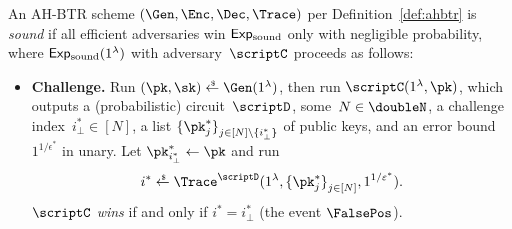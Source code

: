 \begin{definition}[soundness]\label{def:soundness}
An AH-BTR scheme $(\Gen,\Enc,\Dec,\Trace)$ per Definition~\ref{def:ahbtr} is \emph{sound}
if all efficient adversaries win $\ExpSound$ only with negligible probability,
where $\ExpSound(1^\lambda)$ with adversary~$\scriptC$ proceeds as follows:
\begin{itemize}\upshape
\item\textbf{Challenge.}
Run ${(\pk,\sk)\draws\Gen(1^\lambda)}$,
then run $\scriptC(1^\lambda,\pk)$, which outputs
a (probabilistic) circuit~$\scriptD$,
some~${N\in\doubleN}$,
a challenge index~${i_\bot^\ast\in[N]}$,
a list $\{\pk^\ast_j\}_{j\in[N]\setminus\{i_\bot^\ast\}}^\sphantom$ of public keys, and
an error bound $1^{1/\epsilon^\ast}$ in unary.
Let ${\pk^\ast_{i_\bot^\ast}\gets\pk}$ and run
\begin{align*}
i^\ast\draws\Trace^\scriptD(1^\lambda,\{\pk^\ast_j\}_{j\in[N]}^\sphantom,1^{1/\epsilon^\ast}).
\end{align*}
$\scriptC$ \emph{wins} if and only if ${i^\ast=i_\bot^\ast}$
(the event $\FalsePos$).
\end{itemize}
\end{definition}
